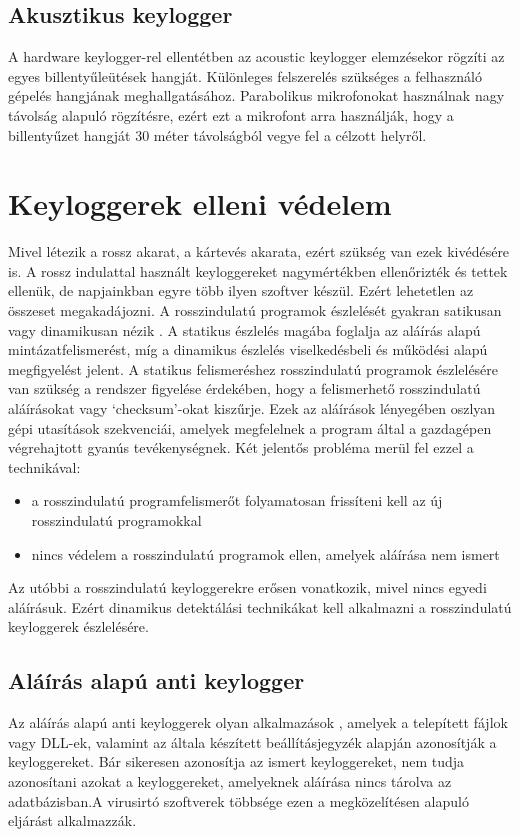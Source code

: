 \documentclass[12pt,a4paper,oneside]{report}
\begin{document}
\subsection{Akusztikus keylogger}
A hardware keylogger-rel ellentétben az acoustic keylogger elemzésekor rögzíti az egyes billentyűleütések hangját. Különleges felszerelés szükséges a felhasználó gépelés hangjának meghallgatásához. Parabolikus mikrofonokat használnak nagy távolság alapuló rögzítésre, ezért ezt a mikrofont arra használják, hogy a billentyűzet hangját 30 méter távolságból vegye fel a célzott helyről.

\section{Keyloggerek elleni védelem}
Mivel létezik a rossz akarat, a kártevés akarata, ezért szükség van ezek kivédésére is. A rossz indulattal használt keyloggereket nagymértékben ellenőrizték és tettek ellenük, de napjainkban egyre több ilyen szoftver készül. Ezért lehetetlen az összeset megakadájozni. A rosszindulatú programok észlelését gyakran satikusan vagy dinamikusan nézik  \cite{wood2010keyloggers}. A statikus észlelés magába foglalja az aláírás alapú mintázatfelismerést, míg a dinamikus észlelés viselkedésbeli és működési alapú megfigyelést jelent. A statikus felismeréshez rosszindulatú programok észlelésére van szükség a rendszer figyelése érdekében, hogy a felismerhető rosszindulatú aláírásokat vagy `checksum'-okat kiszűrje. Ezek az aláírások lényegében oszlyan gépi utasítások szekvenciái, amelyek megfelelnek a program által a gazdagépen végrehajtott gyanús tevékenységnek. Két jelentős probléma merül fel ezzel a technikával:
\begin{itemize}
\item a rosszindulatú programfelismerőt folyamatosan frissíteni kell az új rosszindulatú programokkal
\item nincs védelem a rosszindulatú programok ellen, amelyek aláírása nem ismert
\end{itemize}
Az utóbbi a rosszindulatú keyloggerekre erősen vonatkozik, mivel nincs egyedi aláírásuk. Ezért dinamikus detektálási technikákat kell alkalmazni a rosszindulatú keyloggerek észlelésére.

\subsection{Aláírás alapú anti keylogger}
Az aláírás alapú anti keyloggerek olyan alkalmazások \cite{tuli2013system}, amelyek a telepített fájlok vagy DLL-ek, valamint az általa készített beállításjegyzék alapján azonosítják a keyloggereket. Bár sikeresen azonosítja az ismert keyloggereket, nem tudja azonosítani azokat a keyloggereket, amelyeknek aláírása nincs tárolva az adatbázisban.A virusirtó szoftverek többsége ezen a megközelítésen alapuló eljárást alkalmazzák.
\end{document}
